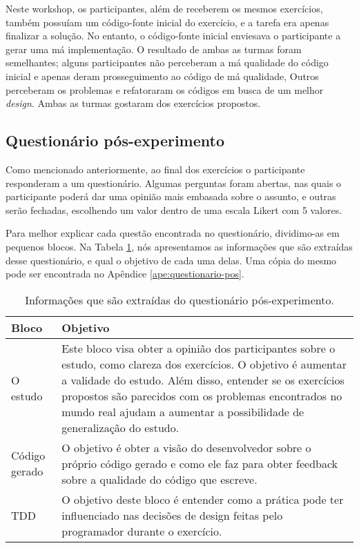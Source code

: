 Neste workshop, os participantes, além de receberem os mesmos
exercícios, também possuíam um código-fonte inicial do exercício, e a tarefa era
apenas finalizar a solução. No entanto, o código-fonte inicial enviesava o participante a gerar
uma má implementação. O resultado de ambas as turmas foram semelhantes; alguns participantes
não perceberam a má qualidade do código inicial e apenas deram prosseguimento ao código
de má qualidade, Outros perceberam os problemas e refatoraram os códigos em busca
de um melhor \textit{design}. Ambas as turmas gostaram dos exercícios
propostos.


\subsection{Questionário pós-experimento}
\label{sec:questionario}

Como mencionado anteriormente, ao final dos exercícios o participante responderam a um questionário.
Algumas perguntas foram abertas, nas quais o participante poderá dar uma opinião mais embasada sobre o assunto,
e outras serão fechadas, escolhendo um valor dentro de uma escala
Likert com 5 valores.

Para melhor explicar cada questão encontrada no questionário, dividimo-as em pequenos blocos. 
Na Tabela \ref{tab:questionario-pos}, nós apresentamos
as informações que são extraídas desse questionário, e qual o objetivo de cada uma delas. Uma cópia
do mesmo pode ser encontrada no Apêndice \ref{ape:questionario-pos}.

\begin{table}
	\begin{tabular}{ | p{5cm} | p{5cm} |}
		
		\hline
		
		Bloco & Objetivo \\
		
		\hline
		
		O estudo &
		Este bloco visa obter a opinião dos participantes sobre o estudo, como clareza dos
		exercícios. O objetivo é aumentar a validade do estudo.
		Além disso, entender se os exercícios propostos são parecidos com os problemas encontrados no mundo
		real ajudam a aumentar a possibilidade de generalização do estudo.
		\\ \hline
		
		Código gerado &
		O objetivo é obter a visão do desenvolvedor sobre o próprio código gerado e como ele
		faz para obter feedback sobre a qualidade do código que escreve.
		\\ \hline
		
		TDD &
		O objetivo deste bloco é entender como a prática pode ter influenciado
		nas decisões de design feitas pelo programador durante o exercício.\\
		
		\hline
		
	\end{tabular}
	\label{tab:questionario-pos}
	\caption{Informações que são extraídas do questionário pós-experimento.}
\end{table}

